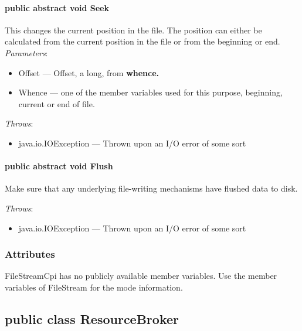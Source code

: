 \documentclass[$Date: 2003/06/26 19:29:31 $]{glabarticle}
\begin{document}
\paragraph{public abstract void Seek}

This changes the current position in the file.  The position can
either be calculated from the current position in the file or from the
beginning or end.\\

\textit{Parameters}:
\begin{itemize}
\item[] Offset --- Offset, a long,  from \bf{whence}.
\item[] Whence --- one of the member variables used for this purpose, beginning, current or end of file.
\end{itemize}

\textit{Throws}:
\begin{itemize}
\item[]  java.io.IOException --- Thrown upon an I/O error of some sort
\end{itemize}

\paragraph{public abstract void Flush}

Make sure that any underlying file-writing mechanisms have flushed
data to disk.

\textit{Throws}:
\begin{itemize}
\item[]  java.io.IOException --- Thrown upon an I/O error of some sort
\end{itemize}



\subsubsection{Attributes}

FileStreamCpi has no publicly available member variables. Use the member variables of FileStream for the
mode information. 


\newpage

\subsection{public class ResourceBroker}
\end{document}
